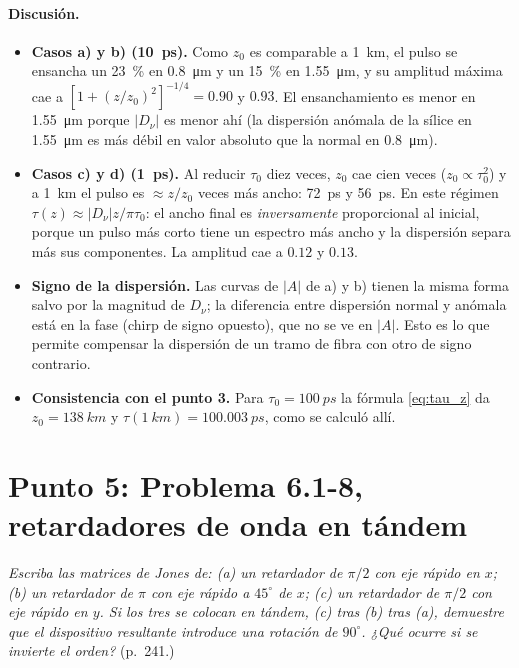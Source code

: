 \documentclass{article}
\newcommand{\Dnu}{D_\nu}
\newcommand{\um}{\si{\micro\metre}}
\begin{document}
\paragraph{Discusión.}
\begin{itemize}
\item \textbf{Casos a) y b) (\SI{10}{ps}).} Como $z_0$ es comparable a \SI{1}{km}, el pulso se
ensancha un \SI{23}{\percent} en \SI{0.8}{\um} y un \SI{15}{\percent} en \SI{1.55}{\um}, y su
amplitud máxima cae a $[1+(z/z_0)^2]^{-1/4}=0.90$ y $0.93$. El ensanchamiento es menor en
\SI{1.55}{\um} porque $|\Dnu|$ es menor ahí (la dispersión anómala de la sílice en
\SI{1.55}{\um} es más débil en valor absoluto que la normal en \SI{0.8}{\um}).
\item \textbf{Casos c) y d) (\SI{1}{ps}).} Al reducir $\tau_0$ diez veces, $z_0$ cae cien veces
($z_0\propto\tau_0^2$) y a \SI{1}{km} el pulso es $\approx z/z_0$ veces más ancho: \SI{72}{ps} y
\SI{56}{ps}. En este régimen $\tau(z)\approx|\Dnu|z/\pi\tau_0$: el ancho final es
\emph{inversamente} proporcional al inicial, porque un pulso más corto tiene un espectro más
ancho y la dispersión separa más sus componentes. La amplitud cae a $0.12$ y $0.13$.
\item \textbf{Signo de la dispersión.} Las curvas de $|A|$ de a) y b) tienen la misma forma salvo
por la magnitud de $\Dnu$; la diferencia entre dispersión normal y anómala está en la fase
(chirp de signo opuesto), que no se ve en $|A|$. Esto es lo que permite compensar la dispersión
de un tramo de fibra con otro de signo contrario.
\item \textbf{Consistencia con el punto 3.} Para $\tau_0=\SI{100}{ps}$ la fórmula \eqref{eq:tau_z} da
$z_0=\SI{138}{km}$ y $\tau(\SI{1}{km})=\SI{100.003}{ps}$, como se calculó allí.
\end{itemize}

\section{Punto 5: Problema 6.1-8, retardadores de onda en tándem}

\emph{Escriba las matrices de Jones de: (a) un retardador de $\pi/2$ con eje rápido en $x$; (b)
un retardador de $\pi$ con eje rápido a $45^\circ$ de $x$; (c) un retardador de $\pi/2$ con eje
rápido en $y$. Si los tres se colocan en tándem, (c) tras (b) tras (a), demuestre que el
dispositivo resultante introduce una rotación de $90^\circ$. ¿Qué ocurre si se invierte el
orden?} (p.~241.)
\end{document}

